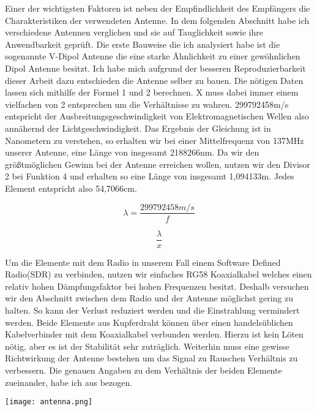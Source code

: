\begin{multicols*}{2}
    Einer der wichtigsten Faktoren ist neben der Empfindlichkeit des Empfängers die Charakteristiken der verwendeten Antenne. In dem folgenden Abschnitt habe ich verschiedene Antennen verglichen und sie auf Tauglichkeit sowie ihre Anwendbarkeit geprüft. Die erste Bauweise die ich analysiert habe ist die sogenannte V-Dipol Antenne die eine starke Ähnlichkeit zu einer gewöhnlichen Dipol Antenne besitzt. Ich habe mich aufgrund der besseren Reproduzierbarkeit dieser Arbeit dazu entschieden die Antenne selber zu bauen. Die nötigen Daten lassen sich mithilfe der Formel 1 und 2 berechnen. X muss dabei immer einem vielfachen von 2 entsprechen um die Verhältnisse zu wahren. 299792458m/s entspricht der Ausbreitungsgeschwindigkeit von Elektromagnetischen Wellen also annähernd der Lichtgeschwindigkeit. Das Ergebnis der Gleichung ist in Nanometern zu verstehen, so erhalten wir bei einer Mittelfrequenz von 137MHz unserer Antenne, eine Länge von insgesamt 2188266nm. Da wir den größtmöglichen Gewinn bei der Antenne erreichen wollen, nutzen wir den Divisor 2 bei Funktion 4 und erhalten so eine Länge von insgesamt 1,094133m. Jedes Element entspricht also 54,7066cm.    

    \begin{equation}
        \lambda = \frac{299792458 m/s}{f}  
    \end{equation}


    \begin{equation}
        \frac{\lambda}{x}  
    \end{equation}

    Um die Elemente mit dem Radio in unserem Fall einem Software Defined Radio(SDR) zu verbinden, nutzen wir einfaches RG58 Koaxialkabel welches einen relativ hohen Dämpfungsfaktor bei hohen Frequenzen besitzt. Deshalb versuchen wir den Abschnitt zwischen dem Radio und der Antenne möglichst gering zu halten. So kann der Verlust reduziert werden und die Einstrahlung vermindert werden. Beide Elemente aus Kupferdraht können über einen handelsüblichen Kabelverbinder mit dem Koaxialkabel verbunden werden. Hierzu ist kein Löten nötig, aber es ist der Stabilität sehr zuträglich. Weiterhin muss eine gewisse Richtwirkung der Antenne bestehen um das Signal zu Rauschen Verhältnis zu verbessern. Die genauen Angaben zu dem Verhältnis der beiden Elemente zueinander, habe ich aus \cite[]{Diy137MHz} bezogen. 
    \begin{center}
        \centering
        \texttt{[image: antenna.png]}
    \end{center}
\end{multicols*}
